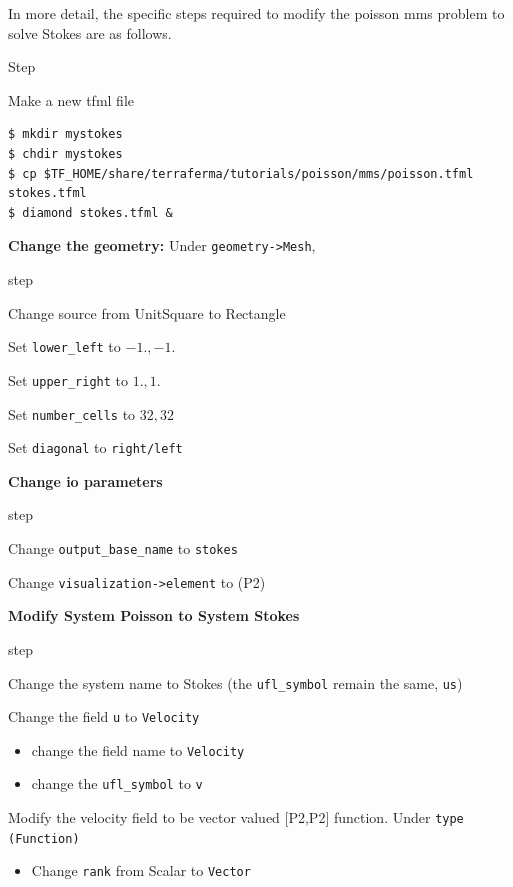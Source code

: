 \pagebreak{}

In more detail, the specific steps required to modify the poisson mms
problem to solve Stokes are as follows.
\begin{steps}{Step}
\item Make a new tfml file
  \begin{lstlisting}[style=Bash]
$ mkdir mystokes
$ chdir mystokes
$ cp $TF_HOME/share/terraferma/tutorials/poisson/mms/poisson.tfml stokes.tfml
$ diamond stokes.tfml &
  \end{lstlisting}%
\item \textbf{Change the geometry:} Under \texttt{geometry->Mesh},
  \begin{steps}{step}
  \item Change source from UnitSquare to Rectangle
  \item Set \texttt{lower\_left} to $-1.,-1.$
  \item Set \texttt{upper\_right} to $1.,1.$
  \item Set \texttt{number\_cells} to $32,32$
  \item Set \texttt{diagonal} to \texttt{right/left}
  \end{steps}
\item \textbf{Change io parameters}
  \begin{steps}{step}
  \item Change \texttt{output\_base\_name} to \texttt{stokes}
  \item Change \texttt{visualization->element} to (P2)
  \end{steps}
\item \textbf{Modify System Poisson to System Stokes}
  \begin{steps}{step}
  \item Change the system name to  Stokes (the \texttt{ufl\_symbol}
    remain the same, \texttt{us})
  \item Change the field \texttt{u} to \texttt{Velocity}
    \begin{itemize}{}
    \item change the field name to \texttt{Velocity}
    \item change the \texttt{ufl\_symbol} to \texttt{v}
    \end{itemize}
  \item Modify the velocity field to be vector valued [P2,P2]
    function.   Under \texttt{type (Function)}
    \begin{itemize}{}
    \item Change \texttt{rank} from Scalar to \texttt{Vector}

\end{itemize}
\end{steps}
\end{steps}
